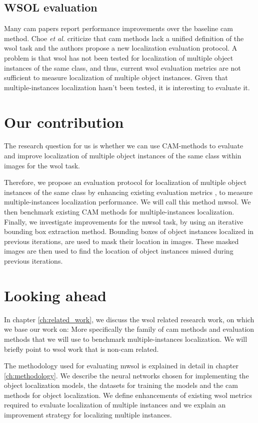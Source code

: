 \subsection{WSOL evaluation}
Many \acrshort{cam} papers report performance improvements over the baseline \acrshort{cam} method. Choe \textit{et al.} \cite{choe2020evaluating} criticize that \acrshort{cam} methods lack a unified definition of the \acrshort{wsol} task and the authors propose a new localization evaluation protocol. A problem is that \acrshort{wsol} has not been tested for localization of multiple object instances of the same class, and thus, current \acrshort{wsol} evaluation metrics are not sufficient to measure localization of multiple object instances. Given that multiple-instances localization hasn't been tested, it is interesting to evaluate it. 

\section{Our contribution}
The research question for us is whether we can use CAM-methods to evaluate and improve localization of multiple object instances of the same class within images for the \acrshort{wsol} task.

Therefore, we propose an evaluation protocol for localization of multiple object instances of the same class by enhancing existing evaluation metrics \cite{choe2020evaluating}, to measure multiple-instances localization performance. We will call this method \acrfull{mwsol}. We then benchmark existing CAM methods for multiple-instances localization. Finally, we investigate improvements for the \acrshort{mwsol} task, by using an iterative bounding box extraction method. Bounding boxes of object instances localized in previous iterations, are used to mask their location in images. These masked images are then used to find the location of object instances missed during previous iterations.

\section{Looking ahead}
In chapter \ref{ch:related_work}, we discuss the \acrshort{wsol} related research work, on which we base our work on: More specifically the family of \acrshort{cam} methods and evaluation methods that we will use to benchmark multiple-instances localization. We will briefly point to \acrshort{wsol} work that is non-\acrshort{cam} related. 

The methodology used for evaluating \acrlong{mwsol} is explained in detail in chapter \ref{ch:methodology}. We describe the neural networks chosen for implementing the object localization models, the datasets for training the models and the \acrshort{cam} methods for object localization. We define enhancements of existing \acrshort{wsol} metrics required to evaluate localization of multiple instances and we explain an improvement strategy for localizing multiple instances.

